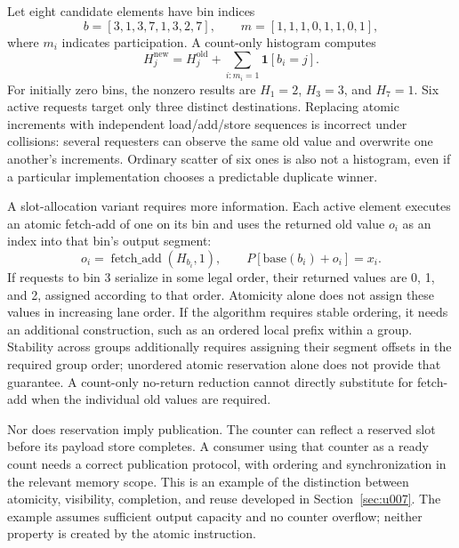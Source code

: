 Let eight candidate elements have bin indices
\begin{equation}
 b=[3,1,3,7,1,3,2,7],\qquad
 m=[1,1,1,0,1,1,0,1],
 \label{eq:u004_example_indices}
\end{equation}
where $m_i$ indicates participation. A count-only histogram computes
\begin{equation}
 H_j^{\mathrm{new}}=H_j^{\mathrm{old}}
                   +\sum_{i:m_i=1}\mathbf{1}[b_i=j].
 \label{eq:u004_histogram}
\end{equation}
For initially zero bins, the nonzero results are $H_1=2$, $H_3=3$, and $H_7=1$. Six active requests target only three distinct destinations. Replacing atomic increments with independent load/add/store sequences is incorrect under collisions: several requesters can observe the same old value and overwrite one another's increments. Ordinary scatter of six ones is also not a histogram, even if a particular implementation chooses a predictable duplicate winner.

A slot-allocation variant requires more information. Each active element executes an atomic fetch-add of one on its bin and uses the returned old value $o_i$ as an index into that bin's output segment:
\begin{equation}
 o_i=\operatorname{fetch\_add}(H_{b_i},1),\qquad
 P[\mathrm{base}(b_i)+o_i]=x_i.
 \label{eq:u004_slot_allocation}
\end{equation}
If requests to bin 3 serialize in some legal order, their returned values are 0, 1, and 2, assigned according to that order. Atomicity alone does not assign these values in increasing lane order. If the algorithm requires stable ordering, it needs an additional construction, such as an ordered local prefix within a group. Stability across groups additionally requires assigning their segment offsets in the required group order; unordered atomic reservation alone does not provide that guarantee. A count-only no-return reduction cannot directly substitute for fetch-add when the individual old values are required.

Nor does reservation imply publication. The counter can reflect a reserved slot before its payload store completes. A consumer using that counter as a ready count needs a correct publication protocol, with ordering and synchronization in the relevant memory scope. This is an example of the distinction between atomicity, visibility, completion, and reuse developed in Section~\ref{sec:u007}. The example assumes sufficient output capacity and no counter overflow; neither property is created by the atomic instruction.

